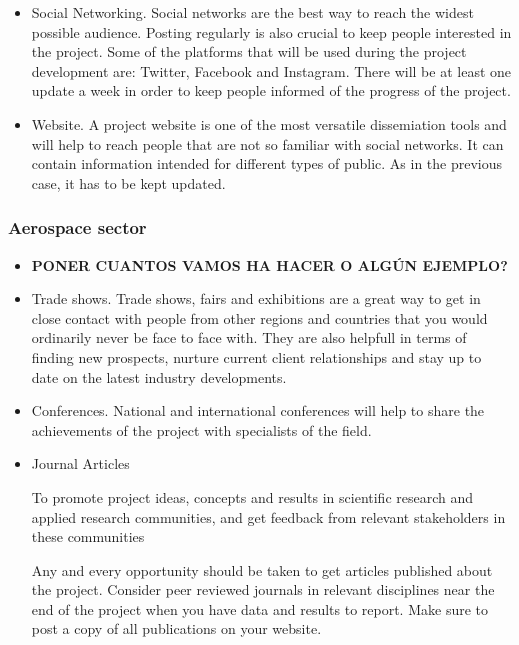 \begin{itemize}
\item{ 
	Social Networking. Social networks are the best way to reach the widest possible audience. Posting regularly is also crucial to keep people interested in the project. Some of the platforms that will be used during the project development are: Twitter, Facebook and Instagram. There will be at least one update a week in order to keep people informed of the progress of the project.
}
\item {
	Website. A project website is one of the most versatile dissemiation tools and will help to reach people that are not so familiar with social networks. It can contain information intended for different types of public. As in the previous case, it has to be kept updated.
}
\end{itemize}

\subsubsection{Aerospace sector}

\begin{itemize}
\item\textbf{PONER CUANTOS VAMOS HA HACER O ALGÚN EJEMPLO?}
\item{
	Trade shows. Trade shows, fairs and exhibitions are a great way to get in close contact with people from other regions and countries that you would ordinarily never be face to face with. They are also helpfull in terms of finding new prospects, nurture current client relationships and stay up to date on the latest industry developments. 
}
\item {
	Conferences. National and international conferences will help to share the achievements of the project with specialists of the field.
}
\item {
	Journal Articles
	
	
	To promote project ideas, concepts and results in scientific research and applied research communities, and get feedback from relevant stakeholders in these communities
	
	Any and every opportunity should be taken to get articles published about the project. Consider peer reviewed journals in relevant disciplines near the end of the project when you have data and results to report. Make sure to post a copy of all publications on your website. 
}
\end{itemize}